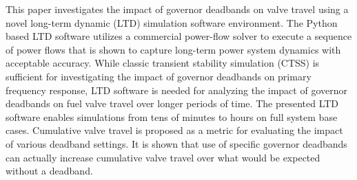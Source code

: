 %
This paper investigates the impact of governor deadbands on valve travel using a novel long-term dynamic (LTD) simulation software environment. 
The Python based LTD software utilizes a commercial power-flow solver to execute a sequence of power flows that is shown to capture long-term power system dynamics with acceptable accuracy.
While classic transient stability simulation (CTSS) is sufficient for investigating the impact of governor deadbands on primary frequency response, LTD software is needed for analyzing the impact of governor deadbands on fuel valve travel over longer periods of time. 
The presented LTD software enables simulations from tens of minutes to hours on full system base cases. %
Cumulative valve travel is proposed as a metric for evaluating the impact of various deadband settings.
It is shown that use of specific governor deadbands can actually increase cumulative valve travel over what would be expected without a deadband.